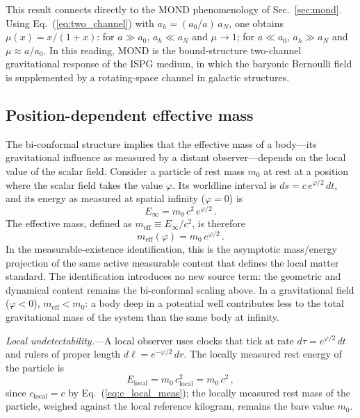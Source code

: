 \documentclass[aps,prd,onecolumn,superscriptaddress,nofootinbib,showpacs,12pt]{revtex4-2}
\newcommand{\azero}{a_{0}}
\begin{document}
This result connects directly to the MOND phenomenology
of Sec.~\ref{sec:mond}.  Using
Eq.~(\ref{eq:two_channel}) with
$a_h=(\azero/a)\,a_N$, one obtains
$\mu(x)=x/(1+x)$: for $a\gg\azero$, $a_h\ll a_N$ and
$\mu\to 1$; for $a\ll\azero$, $a_h\gg a_N$ and
$\mu\approx a/\azero$.  In this reading, MOND is the
bound-structure two-channel gravitational response of the
ISPG medium, in which the baryonic Bernoulli field is
supplemented by a rotating-space channel in galactic
structures.

\subsection{Position-dependent effective mass}
\label{sec:variable_mass}

The bi-conformal structure implies that the effective mass
of a body---its gravitational influence as measured by a
distant observer---depends on the local value of the scalar
field.  Consider a particle of rest mass $m_{0}$ at rest at
a position where the scalar field takes the value $\varphi$.
Its worldline interval is $ds = c\,e^{\varphi/2}\,dt$, and
its energy as measured at spatial infinity ($\varphi = 0$) is
\begin{equation}\label{eq:m_eff}
  E_{\infty} = m_{0}\,c^{2}\,e^{\varphi/2}\,.
\end{equation}
The effective mass, defined as
$m_{\mathrm{eff}} \equiv E_{\infty}/c^{2}$, is therefore
\begin{equation}\label{eq:meff_def}
  \boxed{m_{\mathrm{eff}}(\varphi)
    = m_{0}\,e^{\varphi/2}\,.}
\end{equation}
In the measurable-existence identification, this is the asymptotic
mass/energy projection of the same active measurable content that defines
the local matter standard.  The identification introduces no new source term:
the geometric and dynamical content remains the bi-conformal scaling above.
In a gravitational field ($\varphi < 0$),
$m_{\mathrm{eff}} < m_{0}$: a body deep in a potential
well contributes less to the total gravitational mass
of the system than the same body at infinity.

\textit{Local undetectability.}---A local observer
uses clocks that tick at rate $d\tau = e^{\varphi/2}\,dt$
and rulers of proper length $d\ell = e^{-\varphi/2}\,dr$.
The locally measured rest energy of the particle is
\begin{equation}\label{eq:m_local}
  E_{\mathrm{local}} = m_{0}\,c_{\mathrm{local}}^{2}
  = m_{0}\,c^{2}\,,
\end{equation}
since $c_{\mathrm{local}} = c$ by
Eq.~(\ref{eq:c_local_meas}); the locally measured rest
mass of the particle, weighed against the local reference
kilogram, remains the bare value $m_{0}$.
\end{document}
